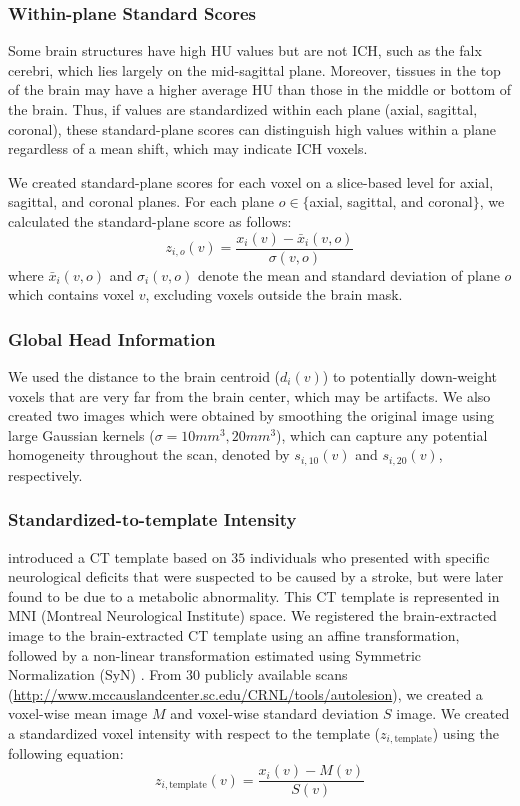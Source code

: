\documentclass[12pt]{report}
\begin{document}
\begin{refsection}
\subsubsection{Within-plane Standard Scores} Some brain structures have high HU values but are not ICH, such as the falx cerebri, which lies largely on the mid-sagittal plane.  Moreover, tissues in the top of the brain may have a higher average HU than those in the middle or bottom of the brain.  Thus, if values are standardized within each plane (axial, sagittal, coronal), these standard-plane scores can distinguish high values within a plane regardless of a mean shift, which may indicate ICH voxels.

We created standard-plane scores for each voxel on a slice-based level for axial, sagittal, and coronal planes. For each plane $o \in \{$axial, sagittal, and coronal$\}$, we calculated the standard-plane score as follows: 
\begin{equation}
z_{i,o}(v) = \frac{x_i(v) - \bar{x}_i(v, o)}{\sigma(v, o)} \label{eq:z}
\end{equation}
where $\bar{x}_i(v, o)$ and $\sigma_i(v, o)$ denote the mean and standard deviation of plane $o$ which contains voxel $v$, excluding voxels outside the brain mask.

\subsubsection{Global Head Information} We used the distance to the brain centroid ($d_{i}(v)$) to potentially down-weight voxels that are very far from the brain center, which may be artifacts.  We also created two images which were obtained by smoothing the original image using large Gaussian kernels ($\sigma = 10mm^3, 20mm^3$), which can capture any potential homogeneity throughout the scan, denoted by $s_{i,10}(v)$ and $s_{i,20}(v)$, respectively.  

\subsubsection{Standardized-to-template Intensity} \citet{rorden_age-specific_2012} introduced a CT template based on $35$ individuals who presented with specific neurological deficits that were suspected to be caused by a stroke, but were later found to be due to a metabolic abnormality.  This CT template is represented in MNI (Montreal Neurological Institute) space.  We registered the brain-extracted image to the brain-extracted CT template using an affine transformation, followed by a non-linear transformation estimated using Symmetric Normalization (SyN) \citep{avants_symmetric_2008}.  From $30$ publicly available scans (\url{http://www.mccauslandcenter.sc.edu/CRNL/tools/autolesion}), we created a voxel-wise mean image $M$ and voxel-wise standard deviation $S$ image.  We created a standardized voxel intensity with respect to the template ($z_{i,\text{template}}$) using the following equation:
$$
z_{i,\text{template}}(v) = \frac{x_{i}(v) - M(v)}{S(v)}
$$


\end{refsection}
\end{document}
